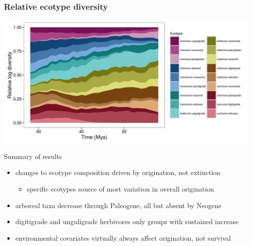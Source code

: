 \documentclass{beamer}
\begin{document}
\begin{frame}
  \frametitle{Relative ecotype diversity}
  \begin{center}
    \includegraphics[height=0.8\textheight,width=\textwidth,keepaspectratio=true]{figure/relative_diversity}
  \end{center}
\end{frame}

\begin{frame}
  \begin{block}{Summary of results}
    \begin{itemize}
      \item changes to ecotype composition driven by origination, not extinction
        \begin{itemize}
          \item specific ecotypes source of most variation in overall origination
        \end{itemize}
      \item arboreal taxa decrease through Paleogene, all but absent by Neogene
      \item digitigrade and unguligrade herbivores only groups with sustained increase
      \item environmental covariates virtually always affect origination, not survival
    \end{itemize}
  \end{block}
\end{frame}
\end{document}
